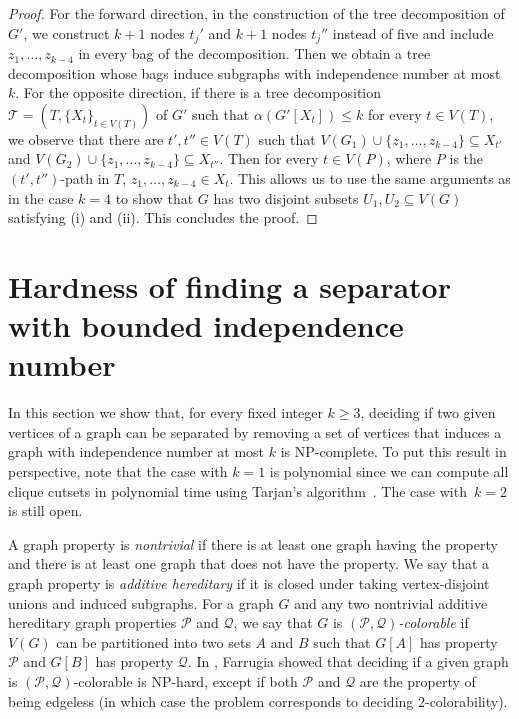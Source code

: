 \documentclass[11pt]{article}
\theoremstyle{definition}
\newcommand{\NP}{\textup{\textsf{NP}}}
\begin{document}
\begin{proof}
For the forward direction, in the construction of the tree decomposition of $G'$, we construct $k+1$ nodes $t_j'$ and $k+1$ nodes $t_j''$ instead of five and
include $z_1,\ldots,z_{k-4}$ in every bag of the decomposition. Then we obtain a tree decomposition whose bags induce subgraphs with independence number at most~$k$.
For the opposite direction, if there is a tree decomposition $\mathcal{T} = (T, \{X_t\}_{t\in V(T)})$ of  $G'$ such that $\alpha(G'[X_t])\leq k$ for every $t\in V(T)$, we observe that there are $t',t''\in V(T)$ such that
$V(G_1)\cup\{z_1,\dots,z_{k-4}\}\subseteq X_{t'}$ and $V(G_2)\cup\{z_1,\dots,z_{k-4}\}\subseteq X_{t''}$. Then for every $t\in V(P)$, where $P$ is the $(t',t'')$-path in $T$, $z_1,\ldots,z_{k-4}\in X_t$. This allows us to use the same arguments as in the case $k=4$ to show that $G$ has two disjoint subsets $U_1,U_2\subseteq V(G)$ satisfying (i) and (ii). This concludes the proof.
\end{proof}


\section{Hardness of finding a separator with bounded independence number\label{sec:hardsep}}

In this section we show that, for every fixed integer $k\ge 3$, deciding if two given vertices of a graph can be separated by removing a set of vertices that induces a graph with independence number at most $k$ is \NP-complete.
To put this result in perspective, note that the case with $k = 1$ is polynomial since we can compute all clique cutsets in polynomial time using Tarjan's algorithm~\cite{MR798539}.
The case with~$k=2$ is still open.

A graph property is \emph{nontrivial} if there is at least one graph having the property and there is at least one graph that does not have the property.
We say that a graph property is \emph{additive hereditary} if it is closed under taking vertex-disjoint unions and induced subgraphs.
For a graph $G$ and any two nontrivial additive hereditary graph properties $\mathcal{P}$ and $\mathcal{Q}$, we say that $G$ is \emph{$(\mathcal{P},\mathcal{Q})$-colorable} if $V(G)$ can be partitioned into two sets $A$ and $B$ such that $G[A]$ has property $\mathcal{P}$ and $G[B]$ has property $\mathcal{Q}$.
In \cite{MR2097312}, Farrugia showed that deciding if a given graph is $(\mathcal{P},\mathcal{Q})$-colorable is \NP-hard, except if both $\mathcal{P}$ and $\mathcal{Q}$ are the property of being edgeless (in which case the problem corresponds to deciding $2$-colorability).
\end{document}
